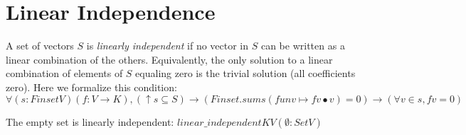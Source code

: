 \section{Linear Independence}

\begin{definition}
  \label{definition : linear_independent}
  \leanok
  A set of vectors $S$ is \emph{linearly independent} if no vector in $S$ can be written as a linear combination of the others. Equivalently, the only solution to a linear combination of elements of $S$ equaling zero is the trivial solution (all coefficients zero). Here we formalize this condition: $\forall (s : Finset V) (f : V \rightarrow K),
(↑s \subseteq S) \rightarrow (Finset.sum s (fun v \mapsto f v \bullet v) = 0) \rightarrow (\forall v \in s, f v = 0)$
\end{definition}

\begin{theorem}
  \label{theorem : linear_independent_empty}
  \leanok
  The empty set is linearly independent: $linear\_independent K V (\emptyset : Set V)$
\end{theorem}
